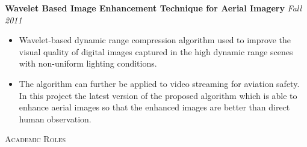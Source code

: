 \documentclass[9pt]{article}
\newenvironment{changemargin}[2]{%
  \begin{list}{}{%
    \setlength{\topsep}{0pt}%
    \setlength{\leftmargin}{#1}%
    \setlength{\rightmargin}{#2}%
    \setlength{\listparindent}{\parindent}%
    \setlength{\itemindent}{\parindent}%
    \setlength{\parsep}{\parskip}%
  }%
  \item[]}{\end{list}
}
\newcommand{\lineover}{
	\begin{changemargin}{-0.05in}{-0.05in}
		\vspace*{-8pt}
		\hrulefill \\
		\vspace*{-2pt}
	\end{changemargin}
}
\newcommand{\header}[1]{
	\begin{changemargin}{-0.5in}{-0.5in}
		\scshape{#1}\\
  	\lineover
	\end{changemargin}
}
\newenvironment{body} {
	\vspace*{-16pt}
	\begin{changemargin}{-0.25in}{-0.5in}
  }	
	{\end{changemargin}
}
\begin{document}
\begin{body}
	\textbf {Wavelet Based Image Enhancement Technique for Aerial Imagery} \hfill \emph{Fall 2011}\\
	
	\begin{itemize} 
		\item Wavelet-based dynamic range compression algorithm used to improve the visual quality of digital images captured in the high dynamic range scenes with non-uniform lighting conditions.
		\item The algorithm can further be applied to video streaming for aviation safety. In this project the latest version of the proposed algorithm which is able to enhance aerial images so that the enhanced images are better than direct human observation.
	\end{itemize}
\end{body}

\smallskip



\header{Academic Roles}
\end{document}
